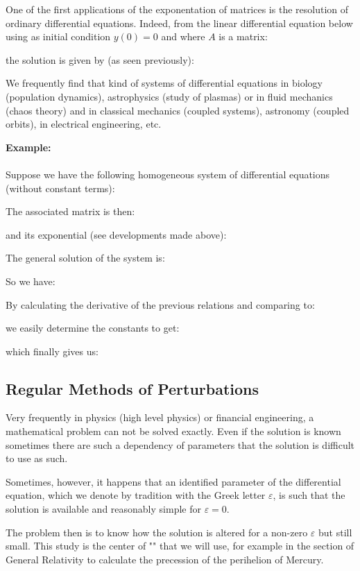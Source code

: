 	One of the first applications of the exponentation of matrices is the resolution of ordinary differential equations. Indeed, from the linear differential equation below using as initial condition $y(0)=0$ and where $A$ is a matrix:
	
	the solution is given by (as seen previously):
	
	We frequently find that kind of systems of differential equations in biology (population dynamics), astrophysics (study of plasmas) or in fluid mechanics (chaos theory) and in classical mechanics (coupled systems), astronomy (coupled orbits), in electrical engineering, etc.
	
	\begin{tcolorbox}[colframe=black,colback=white,sharp corners]
	\textbf{{\Large {}}Example:}\\\\
	Suppose we have the following homogeneous system of differential equations (without constant terms):
	
	The associated matrix is then:
	
	and its exponential (see developments made above):
	
	The general solution of the system is:
	
	So we have:
	
	By calculating the derivative of the previous relations and comparing to:
	
	we easily determine the constants to get:
	
	which finally gives us:
	
	\end{tcolorbox}

	\subsection{Regular Methods of Perturbations}
	Very frequently in physics (high level physics) or financial engineering, a mathematical problem can not be solved exactly. Even if the solution is known sometimes there are such a dependency of parameters that the solution is difficult to use as such.
	
	Sometimes, however, it happens that an identified parameter of the differential equation, which we denote by tradition with the Greek letter $\varepsilon$, is such that the solution is available and reasonably simple for $\varepsilon=0$.
	
	The problem then is to know how the solution is altered for a non-zero $\varepsilon$ but still small. This study is the center of "" that we will use, for example in the section of General Relativity to calculate the precession of the perihelion of Mercury.
	

